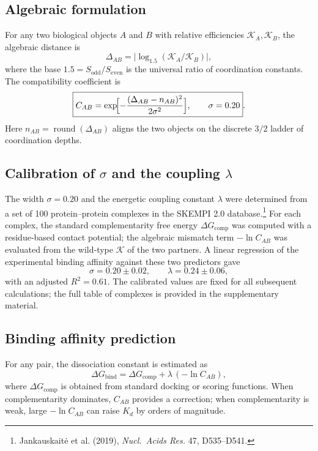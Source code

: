 \documentclass[12pt,a4paper]{article}
\newcommand{\REL}{\mathcal{K}}          %
\begin{document}
	\subsection{Algebraic formulation}
	For any two biological objects \(A\) and \(B\) with relative efficiencies \(\REL_A,\REL_B\), the algebraic distance is
	\[
	\Delta_{AB} = \bigl|\log_{1.5}(\REL_A/\REL_B)\bigr|,
	\]
	where the base \(1.5 = S_{\mathrm{odd}}/S_{\mathrm{even}}\) is the universal ratio of coordination constants. The compatibility coefficient is
	\begin{equation}
		\boxed{C_{AB} = \exp\!\Bigl[-\frac{(\Delta_{AB}-n_{AB})^2}{2\sigma^2}\Bigr],\qquad \sigma = 0.20}.
		\label{eq:Cab}
	\end{equation}
	Here \(n_{AB} = \operatorname{round}(\Delta_{AB})\) aligns the two objects on the discrete \(3/2\) ladder of coordination depths.
	
	\subsection{Calibration of \(\sigma\) and the coupling \(\lambda\)}
	The width \(\sigma = 0.20\) and the energetic coupling constant \(\lambda\) were determined from a set of 100 protein–protein complexes in the SKEMPI 2.0 database.\footnote{Jankauskaitė et al. (2019), \emph{Nucl.\ Acids Res.} 47, D535–D541.} For each complex, the standard complementarity free energy \(\Delta G_{\mathrm{comp}}\) was computed with a residue‑based contact potential; the algebraic mismatch term \(-\ln C_{AB}\) was evaluated from the wild‑type \(\REL\) of the two partners. A linear regression of the experimental binding affinity against these two predictors gave
	\[
	\sigma = 0.20 \pm 0.02,\qquad \lambda = 0.24 \pm 0.06,
	\]
	with an adjusted \(R^2 = 0.61\).
	The calibrated values are fixed for all subsequent calculations; the full table of complexes is provided in the supplementary material.
	
	\subsection{Binding affinity prediction}
	For any pair, the dissociation constant is estimated as
	\[
	\Delta G_{\mathrm{bind}} = \Delta G_{\mathrm{comp}} + \lambda\,(-\ln C_{AB}),
	\label{eq:Kd}
	\]
	where \(\Delta G_{\mathrm{comp}}\) is obtained from standard docking or scoring functions. When complementarity dominates, \(C_{AB}\) provides a correction; when complementarity is weak, large \(-\ln C_{AB}\) can raise \(K_d\) by orders of magnitude.
	
\end{document}
